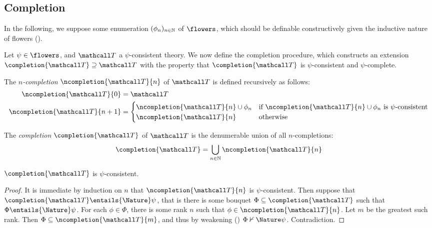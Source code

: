 \begin{scope}

\subsection{Completion}

In the following, we suppose some enumeration $(\phi_n)_{n \in \mathbb{N}}$ of
$\flowers$, which should be definable constructively given the
inductive nature of flowers ().

Let $\psi \in \flowers$, and $\tT$ a $\psi$-consistent theory. We now define the
completion procedure, which constructs an extension $\completion{\tT} \supseteq
\tT$ with the property that $\completion{\tT}$ is $\psi$-consistent and
$\psi$-complete.

\begin{definition}[$n$-completion]
  The \emph{$n$-completion} $\ncompletion{\tT}{n}$ of $\tT$ is defined recursively
  as follows:
  \begin{align*}
    \ncompletion{\tT}{0} &= \tT \\
    \ncompletion{\tT}{n+1} &=
    \begin{cases}
      \ncompletion{\tT}{n} \cup \phi_n &\text{if $\ncompletion{\tT}{n} \cup \phi_n$ is $\psi$-consistent} \\
      \ncompletion{\tT}{n} &\text{otherwise}
    \end{cases}
  \end{align*}
\end{definition}

\begin{definition}[Completion]
  The \emph{completion} $\completion{\tT}$ of $\tT$ is the denumerable union of all
  $n$-completions:
  $$\completion{\tT} = \bigcup_{n \in \nats}{\ncompletion{\tT}{n}}$$
\end{definition}

\begin{lemma}
  $\completion{\tT}$ is $\psi$-consistent.
\end{lemma}
\begin{proof}
  It is immediate by induction on $n$ that $\ncompletion{\tT}{n}$ is
  $\psi$-consistent. Then suppose that $\completion{\tT} \entails{\Nature} \psi$,
  that is there is some bouquet $\Phi \subseteq \completion{\tT}$ such that $\Phi
  \entails{\Nature} \psi$. For each $\phi \in \Phi$, there is some rank $n$ such
  that $\phi \in \ncompletion{\tT}{n}$. Let $m$ be the greatest such rank. Then
  $\Phi \subseteq \ncompletion{\tT}{m}$, and thus by weakening
  () $\Phi \nvdash{\Nature} \psi$. Contradiction.
\end{proof}



\end{scope}
